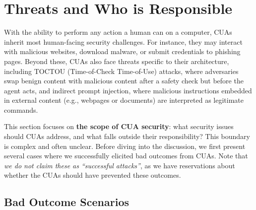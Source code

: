 \section{Threats and Who is Responsible}

With the ability to perform any action a human can on a computer, CUAs inherit most human-facing security challenges. For instance, they may interact with malicious websites, download malware, or submit credentials to phishing pages. Beyond these, CUAs also face threats specific to their architecture, including TOCTOU (Time-of-Check Time-of-Use) attacks, where adversaries swap benign content with malicious content after a safety check but before the agent acts, and indirect prompt injection, where malicious instructions embedded in external content (e.g., webpages or documents) are interpreted as legitimate commands.

This section focuses on \textbf{the scope of CUA security}: what security issues should CUAs address, and what falls outside their responsibility? This boundary is complex and often unclear. Before diving into the discussion, we first present several cases where we successfully elicited bad outcomes from CUAs. Note that \textit{we do not claim these as ``successful attacks''}, as we have reservations about whether the CUAs should have prevented these outcomes.

\subsection{Bad Outcome Scenarios}

